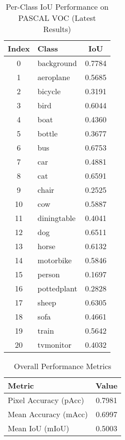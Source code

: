 \begin{table}[ht]
\centering
\caption{Per-Class IoU Performance on PASCAL VOC (Latest Results)}
\begin{tabular}{|c|l|c|}
\hline
\textbf{Index} & \textbf{Class}      & \textbf{IoU} \\ \hline
0  & background   & 0.7784  \\
1  & aeroplane    & 0.5685  \\
2  & bicycle      & 0.3191  \\
3  & bird         & 0.6044  \\
4  & boat         & 0.4360  \\
5  & bottle       & 0.3677  \\
6  & bus          & 0.6753  \\
7  & car          & 0.4881  \\
8  & cat          & 0.6591  \\
9  & chair        & 0.2525  \\
10 & cow          & 0.5887  \\
11 & diningtable  & 0.4041  \\
12 & dog          & 0.6511  \\
13 & horse        & 0.6132  \\
14 & motorbike    & 0.5846  \\
15 & person       & 0.1697  \\
16 & pottedplant  & 0.2828  \\
17 & sheep        & 0.6305  \\
18 & sofa         & 0.4661  \\
19 & train        & 0.5642  \\
20 & tvmonitor    & 0.4032  \\ \hline
\end{tabular}
\end{table}

\begin{table}[ht]
\centering
\caption{Overall Performance Metrics}
\begin{tabular}{|l|c|}
\hline
\textbf{Metric} & \textbf{Value} \\ \hline
Pixel Accuracy (pAcc) & 0.7981 \\
Mean Accuracy (mAcc)  & 0.6997 \\
Mean IoU (mIoU)       & 0.5003 \\ \hline
\end{tabular}
\end{table}

